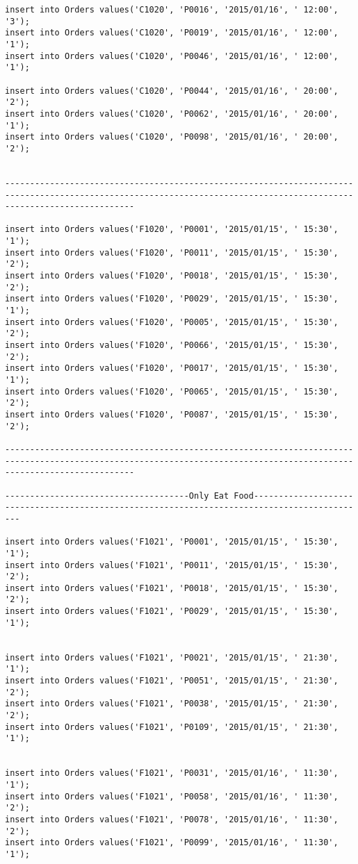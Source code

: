 \documentclass[a4,12pt]{report}
\begin{document}
\begin{lstlisting}
insert into Orders values('C1020', 'P0016', '2015/01/16', ' 12:00', '3');
insert into Orders values('C1020', 'P0019', '2015/01/16', ' 12:00', '1');
insert into Orders values('C1020', 'P0046', '2015/01/16', ' 12:00', '1');

insert into Orders values('C1020', 'P0044', '2015/01/16', ' 20:00', '2');
insert into Orders values('C1020', 'P0062', '2015/01/16', ' 20:00', '1');
insert into Orders values('C1020', 'P0098', '2015/01/16', ' 20:00', '2');


----------------------------------------------------------------------------------------------------------------------------------------------------------------------

insert into Orders values('F1020', 'P0001', '2015/01/15', ' 15:30', '1');
insert into Orders values('F1020', 'P0011', '2015/01/15', ' 15:30', '2');
insert into Orders values('F1020', 'P0018', '2015/01/15', ' 15:30', '2');
insert into Orders values('F1020', 'P0029', '2015/01/15', ' 15:30', '1');
insert into Orders values('F1020', 'P0005', '2015/01/15', ' 15:30', '2');
insert into Orders values('F1020', 'P0066', '2015/01/15', ' 15:30', '2');
insert into Orders values('F1020', 'P0017', '2015/01/15', ' 15:30', '1');
insert into Orders values('F1020', 'P0065', '2015/01/15', ' 15:30', '2');
insert into Orders values('F1020', 'P0087', '2015/01/15', ' 15:30', '2');

----------------------------------------------------------------------------------------------------------------------------------------------------------------------

-------------------------------------Only Eat Food---------------------------------------------------------------------------------------------

insert into Orders values('F1021', 'P0001', '2015/01/15', ' 15:30', '1');
insert into Orders values('F1021', 'P0011', '2015/01/15', ' 15:30', '2');
insert into Orders values('F1021', 'P0018', '2015/01/15', ' 15:30', '2');
insert into Orders values('F1021', 'P0029', '2015/01/15', ' 15:30', '1');


insert into Orders values('F1021', 'P0021', '2015/01/15', ' 21:30', '1');
insert into Orders values('F1021', 'P0051', '2015/01/15', ' 21:30', '2');
insert into Orders values('F1021', 'P0038', '2015/01/15', ' 21:30', '2');
insert into Orders values('F1021', 'P0109', '2015/01/15', ' 21:30', '1');


insert into Orders values('F1021', 'P0031', '2015/01/16', ' 11:30', '1');
insert into Orders values('F1021', 'P0058', '2015/01/16', ' 11:30', '2');
insert into Orders values('F1021', 'P0078', '2015/01/16', ' 11:30', '2');
insert into Orders values('F1021', 'P0099', '2015/01/16', ' 11:30', '1');




\end{lstlisting}
\end{document}
